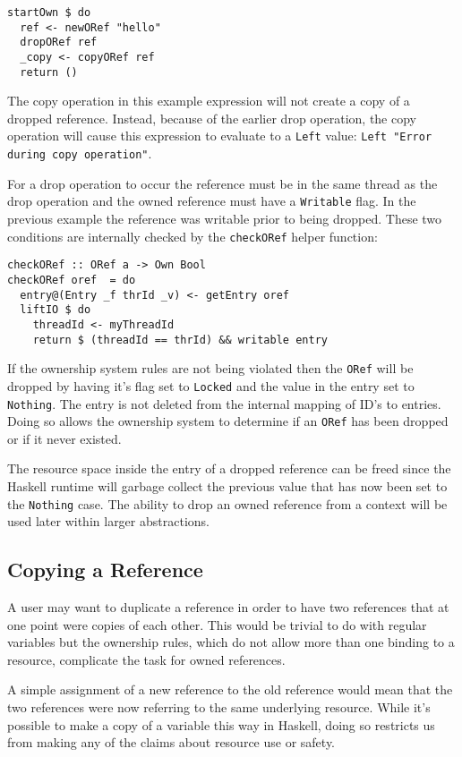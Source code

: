\documentclass[onehalf,11pt]{beavtex}
\begin{document}
\begin{lstlisting}
startOwn $ do
  ref <- newORef "hello"
  dropORef ref
  _copy <- copyORef ref
  return ()
\end{lstlisting}

The copy operation in this example expression will not create a copy of a
dropped reference.
Instead, because of the earlier drop operation, the copy operation will cause
this expression to evaluate to a \texttt{Left}
value: \texttt{Left "Error during copy operation"}. 

For a drop operation to occur the reference must be in the same thread as the
drop operation and the owned reference must have a \texttt{Writable} flag.
In the previous example the reference was writable prior to being dropped.
These two conditions are internally checked by the \texttt{checkORef} helper
function:

\begin{verbatim}
checkORef :: ORef a -> Own Bool
checkORef oref  = do
  entry@(Entry _f thrId _v) <- getEntry oref
  liftIO $ do
    threadId <- myThreadId
    return $ (threadId == thrId) && writable entry
\end{verbatim}

If the ownership system rules are not being violated then the \texttt{ORef}
will be dropped by having it's flag set to \texttt{Locked} and the value in the
entry set to \texttt{Nothing}.
The entry is not deleted from the internal mapping of
ID's to entries. Doing so allows the ownership system to determine if an
\texttt{ORef} has been dropped or if it never existed.

The resource space inside the entry of a dropped reference can be freed since
the Haskell runtime will garbage collect the previous value that has now been
set to the \texttt{Nothing} case.
The ability to drop an owned reference from a context will be used later
within larger abstractions.


\subsection{Copying a Reference}

A user may want to duplicate a reference in order to have two references
that at one point were copies of each other.
This would be trivial to do with regular variables but the ownership rules,
which do not allow more than one binding to a resource, complicate the task for
owned references.

A simple assignment of a new reference to the old reference would mean that
the two references were now referring to the same underlying resource.
While it's possible to make a copy of a variable this way in Haskell,
doing so restricts us from making any of the claims about resource use
or safety.
\end{document}
